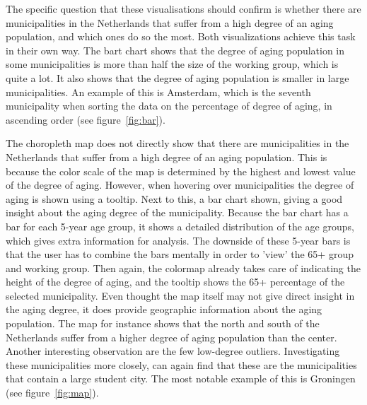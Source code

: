 The specific question that these visualisations should confirm is whether there are municipalities in the Netherlands that suffer from a high degree of an aging population, and which ones do so the most. Both visualizations achieve this task in their own way. The bart chart shows that the degree of aging population in some municipalities is more than half the size of the working group, which is quite a lot. It also shows that the degree of aging population is smaller in large municipalities. An example of this is Amsterdam, which is the seventh municipality when sorting the data on the percentage of degree of aging, in ascending order (see figure~\ref{fig:bar}).

The choropleth map does not directly show that there are municipalities in the Netherlands that suffer from a high degree of an aging population. This is because the color scale of the map is determined by the highest and lowest value of the degree of aging. However, when hovering over municipalities the degree of aging is shown using a tooltip. Next to this, a bar chart shown, giving a good insight about the aging degree of the municipality. Because the bar chart has a bar for each 5-year age group, it shows a detailed distribution of the age groups, which gives extra information for analysis. The downside of these 5-year bars is that the user has to combine the bars mentally in order to 'view' the 65+ group and working group. Then again, the colormap already takes care of indicating the height of the degree of aging, and the tooltip shows the 65+ percentage of the selected municipality. Even thought the map itself may not give direct insight in the aging degree, it does provide geographic information about the aging population. The map for instance shows that the north and south of the Netherlands suffer from a higher degree of aging population than the center. Another interesting observation are the few low-degree outliers. Investigating these municipalities more closely, can again find that these are the municipalities that contain a large student city. The most notable example of this is Groningen (see figure~\ref{fig:map}).

